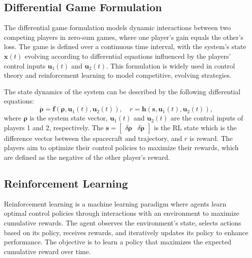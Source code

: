 \documentclass[conference]{IEEEtran}
\begin{document}
\subsection{Differential Game Formulation}
The differential game formulation models dynamic interactions between two competing players in zero-sum games, where one player’s gain equals the other’s loss. The game is defined over a continuous time interval, with the system’s state \( \boldsymbol{x}(t) \) evolving according to differential equations influenced by the players’ control inputs \( \boldsymbol{u}_1(t) \) and \( \boldsymbol{u}_2(t) \). This formulation is widely used in control theory and reinforcement learning to model competitive, evolving strategies.


The state dynamics of the system can be described by the following differential equations:
\begin{equation}
	\dot{\boldsymbol{\rho}} = \boldsymbol{f}(\boldsymbol{\rho}, \boldsymbol{u}_1(t), \boldsymbol{u}_2(t)), \quad r = \boldsymbol{h}( \boldsymbol{s}, \boldsymbol{u}_1(t), \boldsymbol{u}_2(t)),
\end{equation}
where \( \boldsymbol{\rho} \) is the system state vector, \( \boldsymbol{u}_1(t) \) and \( \boldsymbol{u}_2(t) \) are the control inputs of players 1 and 2, respectively.
The \(\boldsymbol{s} = \begin{bmatrix}
	\delta \boldsymbol{\rho} & \delta \dot{\boldsymbol{\rho}}
\end{bmatrix}\) is the RL state which is the difference vector between the spacecraft and trajectory, and \( r \) is reward.
The players aim to optimize their control policies to maximize their rewards, which are defined as the negative of the other player's reward.

\subsection{Reinforcement Learning}
Reinforcement learning is a machine learning paradigm where agents learn optimal control policies through interactions with an environment to maximize cumulative rewards. The agent observes the environment's state, selects actions based on its policy, receives rewards, and iteratively updates its policy to enhance performance. The objective is to learn a policy that maximizes the expected cumulative reward over time.
\end{document}

